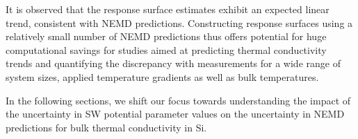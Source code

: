 %
It is observed that the response surface estimates exhibit an expected linear trend, consistent with NEMD
  predictions.  Constructing response surfaces using a
 relatively small number of NEMD predictions thus offers
  potential for huge computational savings for studies aimed at predicting thermal conductivity trends and 
  quantifying the discrepancy with measurements for a wide range of system sizes, applied temperature gradients as 
  well as bulk temperatures.

In the following sections, we shift our focus towards understanding the impact of the uncertainty
in SW potential parameter values on the uncertainty in NEMD predictions for bulk
thermal conductivity in Si.  
 




































